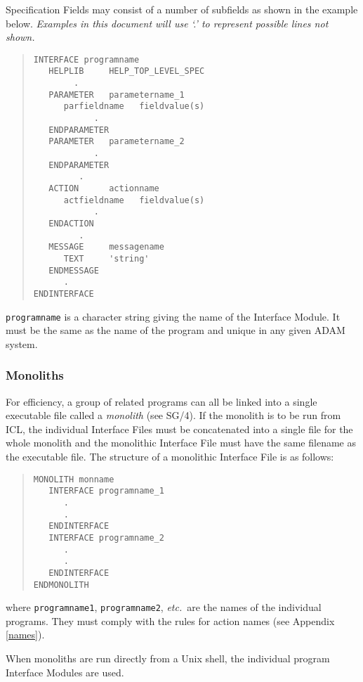 \documentclass[twoside,11pt]{article}
\newcommand{\xref}[3]{#1}
\renewcommand{\_}{\texttt{\symbol{95}}}
\begin{document}
Specification Fields may consist of a number of subfields as shown in the
example below.
{\em Examples in this document will use `.' to represent possible lines not 
shown.}
\begin{quote} \begin{verbatim}
INTERFACE programname
   HELPLIB     HELP_TOP_LEVEL_SPEC
        .
   PARAMETER   parametername_1
      parfieldname   fieldvalue(s)
            .
   ENDPARAMETER
   PARAMETER   parametername_2
            .
   ENDPARAMETER
         .
   ACTION      actionname
      actfieldname   fieldvalue(s)
            .
   ENDACTION
         .
   MESSAGE     messagename
      TEXT     'string'
   ENDMESSAGE
      .
ENDINTERFACE
\end{verbatim} \end{quote}
\texttt{programname} is a character string giving the name of the Interface 
Module. 
It must be the same as the name of the program and unique in any given ADAM 
system.


\subsubsection{Monoliths}
For efficiency, a group of related programs can all be 
linked into a single executable file called a {\em monolith} (see
\xref{SG/4}{sg4}{}).
If the monolith is to be run from ICL, the individual Interface Files must 
be concatenated into a single file for the whole monolith and the monolithic 
Interface File must have the same filename as the executable file.
The structure of a monolithic Interface File is as follows:
\begin{quote} \begin{verbatim}
MONOLITH monname
   INTERFACE programname_1
      .
      .
   ENDINTERFACE
   INTERFACE programname_2
      .
      .
   ENDINTERFACE
ENDMONOLITH
\end{verbatim} \end{quote}
where \texttt{programname\_1}, \texttt{programname\_2}, {\em etc.}\ are the names of 
the individual programs. They must comply with the rules for action names
(see Appendix \ref{names}).

When monoliths are run directly from a Unix shell, the individual program
Interface Modules are used.
\end{document}
